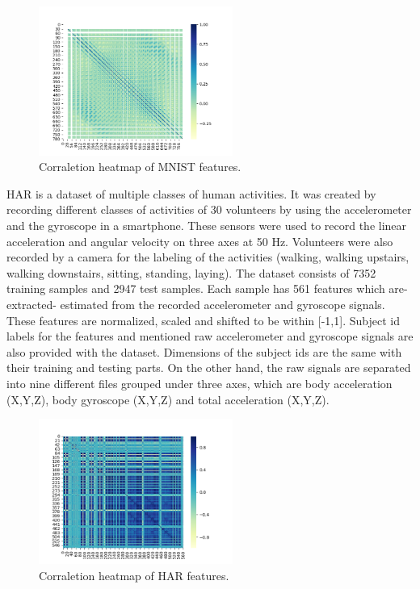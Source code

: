 \documentclass[journal]{IEEEtran}
\begin{document}
\begin{figure}[!ht]
\centering
\includegraphics[width=2.5in]{images/cor_heat_mnist.png}
\caption{Corraletion heatmap of MNIST features.}
\label{fig_mnist}
\end{figure}

HAR is a dataset of multiple classes of human activities. It was created by recording different classes of activities of 30 volunteers
by using the accelerometer and the gyroscope in a smartphone. These sensors were used to record the linear acceleration and angular velocity
on three axes at 50 Hz. Volunteers were also recorded by a camera for the labeling of the activities (walking, walking upstairs, walking downstairs, sitting, standing, laying)\cite{anguita2013public}. The dataset consists of 7352
training samples and 2947 test samples. Each sample has 561 features which are- extracted- estimated from the recorded accelerometer and gyroscope signals. These features are normalized, scaled and shifted to be within [-1,1].  Subject id labels for the features and mentioned raw accelerometer and gyroscope signals are also provided with the dataset.
Dimensions of the subject ids are the same with their training and testing parts. On the other hand, the raw signals are separated into nine different files grouped under three axes, which are body acceleration (X,Y,Z), body gyroscope (X,Y,Z) and total acceleration (X,Y,Z).

\begin{figure}[!ht]
  \centering
  \includegraphics[width=2.5in]{images/cor_heat_har.png}
  \caption{Corraletion heatmap of HAR features.}
  \label{fig_har}
  \end{figure}
  \par
  
\end{document}
